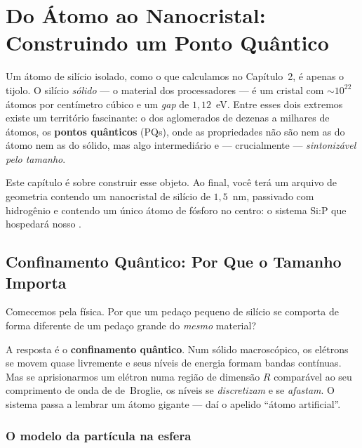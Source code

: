 \chapter{Do Átomo ao Nanocristal: Construindo um Ponto Quântico}
\label{cap:nanocristal}

Um átomo de silício isolado, como o que calculamos no Capítulo~2, é apenas o
tijolo. O silício \emph{sólido} --- o material dos processadores --- é um cristal
com $\sim 10^{22}$ átomos por centímetro cúbico e um \emph{gap} de $1{,}12$~eV. Entre
esses dois extremos existe um território fascinante: o dos aglomerados de dezenas
a milhares de átomos, os \textbf{pontos quânticos} (PQs), onde as propriedades não
são nem as do átomo nem as do sólido, mas algo intermediário e --- crucialmente
--- \emph{sintonizável pelo tamanho}.

Este capítulo é sobre construir esse objeto. Ao final, você terá um arquivo de
geometria contendo um nanocristal de silício de $1{,}5$~nm, passivado com
hidrogênio e contendo um único átomo de fósforo no centro: o sistema Si:P que
hospedará nosso \qubit{}.

\section{Confinamento Quântico: Por Que o Tamanho Importa}
\label{sec:confinamento}

Comecemos pela física. Por que um pedaço pequeno de silício se comporta de forma
diferente de um pedaço grande do \emph{mesmo} material?

A resposta é o \textbf{confinamento quântico}. Num sólido macroscópico, os elétrons
se movem quase livremente e seus níveis de energia formam bandas contínuas. Mas
se aprisionarmos um elétron numa região de dimensão $R$ comparável ao seu
comprimento de onda de de~Broglie, os níveis se \emph{discretizam} e se
\emph{afastam}. O sistema passa a lembrar um átomo gigante --- daí o apelido
``átomo artificial''.

\subsection{O modelo da partícula na esfera}

